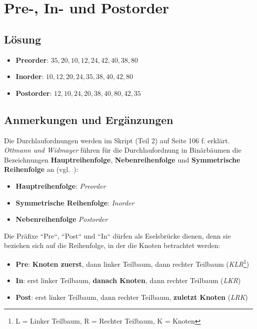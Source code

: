 \chapter{Pre-, In- und Postorder}

\section*{Lösung}

\begin{itemize}
    \item \textbf{Preorder}: $35, 20,  10,  12,  24,  42,  40,  38,  80$
    \item \textbf{Inorder}: $10,  12,  20,  24,  35,  38,  40,  42,  80$
    \item \textbf{Postorder}: $12,  10,  24,  20,  38,  40,  80,  42,  35$
\end{itemize}


\section*{Anmerkungen und Ergänzungen}

Die Durchlaufordnungen werden im Skript (Teil 2) auf Seite 106 f. erklärt.
\\


\textit{Ottmann und Widmayer} führen für die Durchlaufordnung in Binärbäumen die Bezeichnungen \textbf{Hauptreihenfolge},
\textbf{Nebenreihenfolge} und \textbf{Symmetrische Reihenfolge} an (vgl.~\cite[272]{OW17e}):

\begin{itemize}
    \item \textbf{Hauptreihenfolge}: \textit{Preorder}
    \item \textbf{Symmetrische Reihenfolge}: \textit{Inorder}
    \item \textbf{Nebenreihenfolge} \textit{Postorder}
\end{itemize}

Die Präfixe ``Pre``, ``Post`` und ``In`` dürfen als Eselsbrücke dienen, denn sie beziehen sich auf die Reihenfolge, in der die Knoten betrachtet werden:

\begin{itemize}
    \item \textbf{Pre}: \textbf{Knoten zuerst}, dann linker Teilbaum, dann rechter Teilbaum (\textit{KLR}\footnote{L = Linker Teilbaum, R = Rechter Teilbaum, K = Knoten})
    \item \textbf{In}: erst linker Teilbaum, \textbf{danach Knoten}, dann rechter Teilbaum (\textit{LKR})
    \item \textbf{Post}:  erst linker Teilbaum, dann rechter Teilbaum, \textbf{zuletzt Knoten} (\textit{LRK})
\end{itemize}
